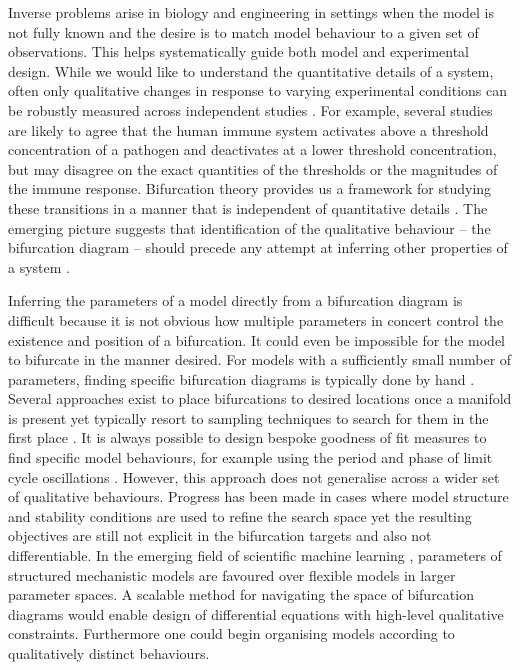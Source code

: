 \documentclass{article}
\begin{document}
Inverse problems \cite{Abdulla2009InverseBiology} arise in biology and engineering in settings when the model is not fully known and the desire is to match model behaviour to a given set of observations. This helps systematically guide both model and experimental design. While we would like to understand the quantitative details of a system, often only qualitative changes in response to varying experimental conditions can be robustly measured across independent studies \cite{Tyson2001NetworkPhysiology,Grant2020InterpretationCircuit}. For example, several studies are likely to agree that the human immune system activates above a threshold concentration of a pathogen and deactivates at a lower threshold concentration, but may disagree on the exact quantities of the thresholds or the magnitudes of the immune response. Bifurcation theory provides us a framework for studying these transitions in a manner that is independent of quantitative details \cite{Kuznetsov2004TopologicalSystems}. The emerging picture suggests that identification of the qualitative behaviour -- the bifurcation diagram -- should precede any attempt at inferring other properties of a system \cite{Stumpf2019ParameterBifurcations}.

Inferring the parameters of a model directly from a bifurcation diagram is difficult because it is not obvious how multiple parameters in concert control the existence and position of a bifurcation. It could even be impossible for the model to bifurcate in the manner desired. For models with a sufficiently small number of parameters, finding specific bifurcation diagrams is typically done by hand \cite{Csikasz-Nagy2006AnalysisRegulation}. Several approaches exist to place bifurcations to desired locations once a manifold is present \cite{Iwasaki1997AnType,Lu2006InverseSystems,Dobson2004DistanceBifurcations} yet typically resort to sampling techniques to search for them in the first place \cite{Chickarmane2005BifurcationTool,Conrad2006BifurcationClock}. It is always possible to design bespoke goodness of fit measures to find specific model behaviours, for example using the period and phase of limit cycle oscillations \cite{Locke2005ModellingThaliana}. However, this approach does not generalise across a wider set of qualitative behaviours. Progress has been made in cases where model structure and stability conditions are used to refine the search space \cite{Otero-Muras2018Optimization-basedModels,Otero-Muras2014ACurves} yet the resulting objectives are still not explicit in the bifurcation targets and also not differentiable. In the emerging field of scientific machine learning \cite{Rackauckas2017Differentialequations.jlJulia,Rackauckas2018ASolutions,Rackauckas2020UniversalLearning}, parameters of structured mechanistic models are favoured over flexible models in larger parameter spaces. A scalable method for navigating the space of bifurcation diagrams would enable design of differential equations with high-level qualitative constraints. Furthermore one could begin organising models according to qualitatively distinct behaviours. 
\end{document}
